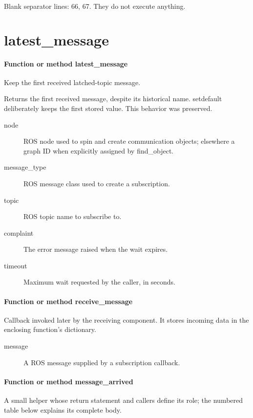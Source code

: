 \documentclass[11pt,a4paper]{book}
\begin{document}
Blank separator lines: 66, 67. They do not execute anything.

\section{latest\_message}

\paragraph{Function or method latest\_message}
Keep the first received latched-topic message.

Returns the first received message, despite its historical name. setdefault deliberately keeps the first stored value. This behavior was preserved.

\begin{description}
\item[node] ROS node used to spin and create communication objects; elsewhere a graph ID when explicitly assigned by find\_object.
\item[message\_type] ROS message class used to create a subscription.
\item[topic] ROS topic name to subscribe to.
\item[complaint] The error message raised when the wait expires.
\item[timeout] Maximum wait requested by the caller, in seconds.
\end{description}

\paragraph{Function or method receive\_message}
Callback invoked later by the receiving component. It stores incoming data in the enclosing function's dictionary.

\begin{description}
\item[message] A ROS message supplied by a subscription callback.
\end{description}

\paragraph{Function or method message\_arrived}
A small helper whose return statement and callers define its role; the numbered table below explains its complete body.
\end{document}
